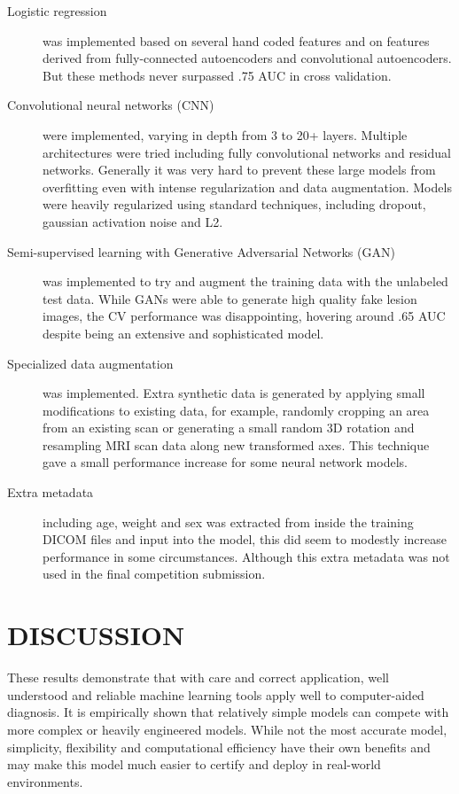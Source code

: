 \documentclass[a4paper]{spie}
\begin{document}
\begin{description}
\item [Logistic regression\cite{Hastie2009}] was implemented based on several hand coded features and on features derived from fully-connected autoencoders and convolutional autoencoders\cite{hinton2006reducing}. But these methods never surpassed .75 AUC in cross validation.
\item [Convolutional neural networks\cite{NIPS2012_4824} (CNN)] were implemented, varying in depth from 3 to 20+ layers. Multiple architectures were tried including fully convolutional networks and residual networks. Generally it was very hard to prevent these large models from overfitting even with intense regularization and data augmentation. Models were heavily regularized using standard techniques, including dropout, gaussian activation noise and L2.
\item [Semi-supervised learning with Generative Adversarial Networks (GAN)\cite{salimans2016improved}] was implemented to try and augment the training data with the unlabeled test data. While GANs were able to generate high quality fake lesion images, the CV performance was disappointing, hovering around .65 AUC despite being an extensive and sophisticated model.
\item [Specialized data augmentation] was implemented. Extra synthetic data is generated by applying small modifications to existing data, for example, randomly cropping an area from an existing scan or generating a small random 3D rotation and resampling MRI scan data along new transformed axes. This technique gave a small performance increase for some neural network models.
\item [Extra metadata] including age, weight and sex was extracted from inside the training DICOM files and input into the model, this did seem to modestly increase performance in some circumstances. Although this extra metadata was not used in the final competition submission.
\end{description}

\section{DISCUSSION}

These results demonstrate that with care and correct application, well understood and reliable machine learning tools apply well to computer-aided diagnosis. It is empirically shown that relatively simple models can compete with more complex or heavily engineered models. While not the most accurate model, simplicity, flexibility and computational efficiency have their own benefits and may make this model much easier to certify and deploy in real-world environments.

\end{document}
